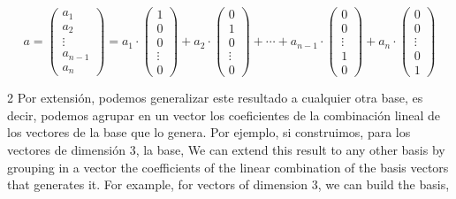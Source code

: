 \begin{equation*}
a=\begin{pmatrix}
a_1\\
a_2\\
\vdots  \\
a_{n-1}\\
a_n
\end{pmatrix} =a_1\cdot \begin{pmatrix}
1\\
0\\
0\\
\vdots \\
0
\end{pmatrix}+a_2 \cdot  \begin{pmatrix}
0\\
1\\
0\\
\vdots \\
0
\end{pmatrix}+
\cdots +
a_{n-1}\cdot \begin{pmatrix}
0\\
0\\
\vdots \\
1\\
0
\end{pmatrix}+
a_n\cdot \begin{pmatrix}
0\\
0\\
\vdots \\
0\\
1
\end{pmatrix}
\end{equation*}

\begin{paracol}{2}
Por extensión, podemos generalizar este resultado a cualquier otra base, es decir, podemos agrupar en un vector los coeficientes de la combinación lineal de los vectores de la base que lo genera. Por ejemplo, si construimos, para los vectores de dimensión $3$, la base,
\switchcolumn
We can extend this result to any other basis by grouping in a vector the coefficients of the linear combination of the basis vectors that generates it. For example, for vectors of dimension $3$, we can build the basis,   
\end{paracol}

